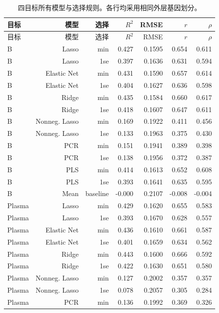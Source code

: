 {\footnotesize\linespread{1}\selectfont\setlength{\tabcolsep}{4pt}\renewcommand{\arraystretch}{1.08}\begin{longtable}{lrrrrrr}\caption{四目标所有模型与选择规则。各行均采用相同外层基因划分。}\\\toprule 目标 & 模型 & 选择 & $R^2$ & RMSE & $r$ & $\rho$\\\midrule\endfirsthead\toprule 目标 & 模型 & 选择 & $R^2$ & RMSE & $r$ & $\rho$\\\midrule\endhead
B & Lasso & min & 0.427 & 0.1595 & 0.654 & 0.611\\
B & Lasso & 1se & 0.397 & 0.1636 & 0.631 & 0.594\\
B & Elastic Net & min & 0.431 & 0.1590 & 0.657 & 0.614\\
B & Elastic Net & 1se & 0.404 & 0.1627 & 0.636 & 0.598\\
B & Ridge & min & 0.435 & 0.1584 & 0.660 & 0.617\\
B & Ridge & 1se & 0.418 & 0.1607 & 0.647 & 0.611\\
B & Nonneg. Lasso & min & 0.169 & 0.1922 & 0.411 & 0.456\\
B & Nonneg. Lasso & 1se & 0.133 & 0.1963 & 0.375 & 0.430\\
B & PCR & min & 0.151 & 0.1941 & 0.389 & 0.398\\
B & PCR & 1se & 0.138 & 0.1956 & 0.372 & 0.387\\
B & PLS & min & 0.414 & 0.1613 & 0.652 & 0.608\\
B & PLS & 1se & 0.393 & 0.1641 & 0.635 & 0.595\\
B & Mean & baseline & -0.000 & 0.2107 & -0.008 & -0.004\\
Plasma & Lasso & min & 0.429 & 0.1620 & 0.655 & 0.583\\
Plasma & Lasso & 1se & 0.393 & 0.1670 & 0.628 & 0.557\\
Plasma & Elastic Net & min & 0.436 & 0.1610 & 0.661 & 0.587\\
Plasma & Elastic Net & 1se & 0.401 & 0.1659 & 0.634 & 0.562\\
Plasma & Ridge & min & 0.443 & 0.1600 & 0.666 & 0.592\\
Plasma & Ridge & 1se & 0.422 & 0.1630 & 0.651 & 0.580\\
Plasma & Nonneg. Lasso & min & 0.127 & 0.2002 & 0.357 & 0.357\\
Plasma & Nonneg. Lasso & 1se & 0.078 & 0.2057 & 0.305 & 0.284\\
Plasma & PCR & min & 0.136 & 0.1992 & 0.369 & 0.326\\

\end{longtable}}
